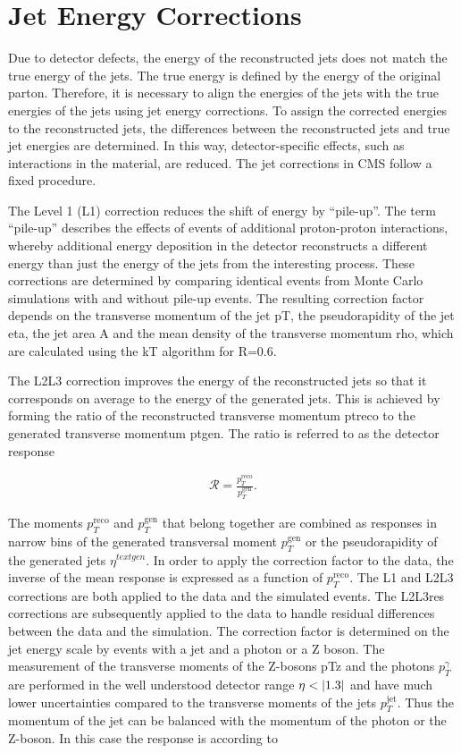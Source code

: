 \documentclass[12pt, a4paper]{thesis}
\begin{document}
\section{Jet Energy Corrections}
\label{sec:org1fc0f38}

Due to detector defects, the energy of the reconstructed jets does not
match the true energy of the jets. The true energy is defined by the
energy of the original parton. Therefore, it is necessary to align the
energies of the jets with the true energies of the jets using jet
energy corrections. To assign the corrected energies to the
reconstructed jets, the differences between the reconstructed jets and
true jet energies are determined. In this way, detector-specific
effects, such as interactions in the material, are reduced.  The
jet corrections in CMS follow a fixed procedure.

The Level 1 (L1) correction reduces the shift of energy by
``pile-up''. The term ``pile-up'' describes the effects of events of
additional proton-proton interactions, whereby additional energy
deposition in the detector reconstructs a different energy than just
the energy of the jets from the interesting process. These corrections
are determined by comparing identical events from Monte Carlo
simulations with and without pile-up events. The resulting correction
factor depends on the transverse momentum of the jet pT, the
pseudorapidity of the jet eta, the jet area A and the mean density of
the transverse momentum rho, which are calculated using the kT
algorithm for R=0.6.

The L2L3 correction improves the energy of the reconstructed jets so
that it corresponds on average to the energy of the generated
jets. This is achieved by forming the ratio of the reconstructed
transverse momentum ptreco to the generated transverse momentum
ptgen. The ratio is referred to as the detector response

\begin{align}
\mathcal{R} = \frac{p^{\text{reco}}_T}{p^{\text{gen}}_T}.
\end{align}


The moments \(p^{\text{reco}}_T\) and \(p^{\text{gen}}_T\) that belong
together are combined as responses in narrow bins of the generated
transversal moment \(p^{\text{gen}}_T\) or the pseudorapidity of the
generated jets \(\eta^{text{gen}}\). In order to apply the correction
factor to the data, the inverse of the mean response is expressed as a
function of \(p^{\text{reco}}_T\). The L1 and L2L3 corrections are both
applied to the data and the simulated events.  The L2L3res corrections
are subsequently applied to the data to handle residual differences
between the data and the simulation. The correction factor is
determined on the jet energy scale by events with a jet and a photon
or a Z boson. The measurement of the transverse moments of the
Z-bosons pTz and the photons \(p_T^{\gamma}\) are performed in the well
understood detector range \(\eta < \abs{1.3}\) and have much lower
uncertainties compared to the transverse moments of the jets
\(p_T^{\text{jet}}\). Thus the momentum of the jet can be balanced with
the momentum of the photon or the Z-boson. In this case the response
is according to
\end{document}
